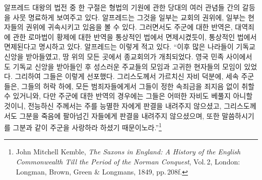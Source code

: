 알프레드 대왕의 법전 중 한 구절은
형법의 기원에 관한
당대의 여러 관념들 간의 갈등을 사뭇 명료하게 보여주고 있다.
알프레드는 그것을
일부는 교회의 권위에,
일부는 현자들의 권위에
귀속시키고 있음을 볼 수 있다.
그러면서도
주군에 대한 반역은,
대역죄에 관한
로마법이
황제에 대한 반역을 통상적인 법에서 면제시켰듯이,
통상적인 법에서 면제된다고 명시하고 있다.
알프레드는 이렇게 적고 있다.
``이후 많은 나라들이 기독교 신앙을 받아들였고,
땅 위의 모든 곳에서 종교회의가 개최되었다.
영국 민족 사이에서도 기독교 신앙을 받아들인 후
성스러운 주교들의 모임과 고귀한 현자들의 모임이 있었다.
그리하여 그들은 이렇게 선포했다.
그리스도께서 가르치신 자비 덕분에,
세속 주군들은,
그들의 허락 하에,
모든 범죄자들에게서 그들이 정한 속죄금을
죄지음 없이
취할 수 있거니와,
다만 주군에 대한 반역의 경우에는
그들은 어떠한 자비도 베풀지 아니할 것이니,
전능하신 주께서는 주를 능멸한 자에게 판결을 내려주지 않으셨고,
그리스도께서도 그분을 죽음에 팔아넘긴 자들에게 판결을 내려주지 않으셨으며,
또한 말씀하시기를 그분과 같이 주군을 사랑하라 하셨기 때문이노라.''\footnote{%
  \latinmarks
  John Mitchell Kemble,
  \textit{The Saxons in England: A History of the English Commonwealth Till the Period of the Norman Conquest}, Vol.\,2,
  London: Longman, Brown, Green \& Longmans, 1849,
  pp.\,208f.}




